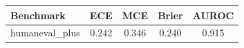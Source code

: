 \begin{tabular}{lcccc}
\toprule
Benchmark & ECE & MCE & Brier & AUROC \\
\midrule
humaneval_plus & 0.242 & 0.346 & 0.240 & 0.915 \\
\bottomrule
\end{tabular}
